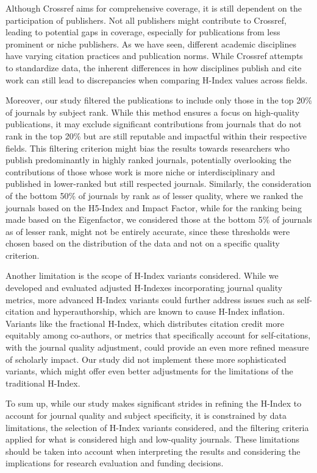 Although Crossref aims for comprehensive coverage, it is still dependent on the
participation of publishers. Not all publishers might contribute to Crossref,
leading to potential gaps in coverage, especially for publications from less
prominent or niche publishers. As we have seen, different academic disciplines
have varying citation practices and publication norms. While Crossref attempts
to standardize data, the inherent differences in how disciplines publish and
cite work can still lead to discrepancies when comparing H-Index values across
fields.

Moreover, our study filtered the publications to include only those in the top
20\% of journals by subject rank. While this method ensures a focus on
high-quality publications, it may exclude significant contributions from
journals that do not rank in the top 20\% but are still reputable and impactful
within their respective fields. This filtering criterion might bias the results
towards researchers who publish predominantly in highly ranked journals,
potentially overlooking the contributions of those whose work is more niche or
interdisciplinary and published in lower-ranked but still respected journals.
Similarly, the consideration of the bottom 50\% of journals by rank as of
lesser quality, where we ranked the journals based on the H5-Index and Impact
Factor, while for the ranking being made based on the Eigenfactor, we
considered those at the bottom 5\% of journals as of lesser rank, might not be
entirely accurate, since these thresholds were chosen based on the distribution
of the data and not on a specific quality criterion. %

Another limitation is the scope of H-Index variants considered. While we
developed and evaluated adjusted H-Indexes incorporating journal quality
metrics, more advanced H-Index variants could further address issues such as
self-citation and hyperauthorship, which are known to cause H-Index inflation.
Variants like the fractional H-Index, which distributes citation credit more
equitably among co-authors, or metrics that specifically account for
self-citations, with the journal quality adjustment, could provide an even more
refined measure of scholarly impact. Our study did not implement these more
sophisticated variants, which might offer even better adjustments for the
limitations of the traditional H-Index.

To sum up, while our study makes significant strides in refining the H-Index to
account for journal quality and subject specificity, it is constrained by data
limitations, the selection of H-Index variants considered, and the filtering
criteria applied for what is considered high and low-quality journals. These
limitations should be taken into account when interpreting the results and
considering the implications for research evaluation and funding decisions.
